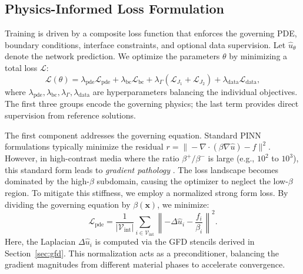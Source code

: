 \documentclass[11pt]{article}
\theoremstyle{definition}
\theoremstyle{remark}
\theoremstyle{plain}
\begin{document}
\subsection{Physics-Informed Loss Formulation}
\label{sec:loss}

Training is driven by a composite loss function that enforces the governing PDE, boundary conditions, interface constraints, and optional data supervision. Let $\hat{u}_\theta$ denote the network prediction. We optimize the parameters $\theta$ by minimizing a total loss $\mathcal{L}$:
\begin{equation}
    \mathcal{L}(\theta) = \lambda_{\text{pde}} \mathcal{L}_{\text{pde}} + \lambda_{\text{bc}} \mathcal{L}_{\text{bc}} + \lambda_{\Gamma} (\mathcal{L}_{J_1} + \mathcal{L}_{J_2}) + \lambda_{\text{data}} \mathcal{L}_{\text{data}},
\end{equation}
where $\lambda_{\text{pde}}, \lambda_{\text{bc}}, \lambda_{\Gamma}, \lambda_{\text{data}}$ are hyperparameters balancing the individual objectives. The first three groups encode the governing physics; the last term provides direct supervision from reference solutions.

The first component addresses the governing equation. Standard PINN formulations \cite{raissi2019physics} typically minimize the residual $r = \| -\nabla \cdot (\beta \nabla \hat{u}) - f \|^2$. However, in high-contrast media where the ratio $\beta^+ / \beta^-$ is large (e.g., $10^2$ to $10^3$), this standard form leads to \textit{gradient pathology} \cite{wang2021understanding}. The loss landscape becomes dominated by the high-$\beta$ subdomain, causing the optimizer to neglect the low-$\beta$ region. To mitigate this stiffness, we employ a normalized strong form loss. By dividing the governing equation by $\beta(\mathbf{x})$, we minimize:
\begin{equation}
    \mathcal{L}_{\text{pde}} = \frac{1}{|\mathcal{V}_{\text{int}}|} \sum_{i \in \mathcal{V}_{\text{int}}} \left\| -\Delta \hat{u}_i - \frac{f_i}{\beta_i} \right\|^2.
\end{equation}
Here, the Laplacian $\Delta \hat{u}_i$ is computed via the GFD stencils derived in Section~\ref{sec:gfd}. This normalization acts as a preconditioner, balancing the gradient magnitudes from different material phases to accelerate convergence.
\end{document}
